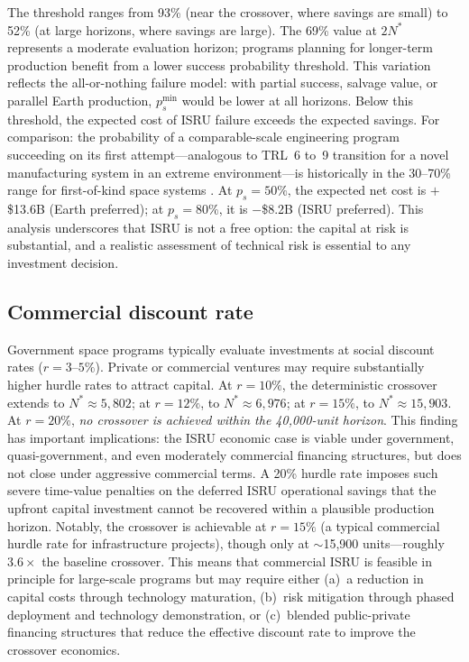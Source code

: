 \documentclass[5p,twocolumn]{elsarticle}
\begin{document}
The threshold ranges from 93\% (near the crossover, where savings are small) to 52\% (at large horizons, where savings are large). The 69\% value at $2N^*$ represents a moderate evaluation horizon; programs planning for longer-term production benefit from a lower success probability threshold. This variation reflects the all-or-nothing failure model: with partial success, salvage value, or parallel Earth production, $p_s^{\min}$ would be lower at all horizons. Below this threshold, the expected cost of ISRU failure exceeds the expected savings. For comparison: the probability of a comparable-scale engineering program succeeding on its first attempt---analogous to TRL~6 to~9 transition for a novel manufacturing system in an extreme environment---is historically in the 30--70\% range for first-of-kind space systems \cite{wertz2011}. At $p_s = 50\%$, the expected net cost is $+$\$13.6B (Earth preferred); at $p_s = 80\%$, it is $-$\$8.2B (ISRU preferred). This analysis underscores that ISRU is not a free option: the capital at risk is substantial, and a realistic assessment of technical risk is essential to any investment decision.

\subsection{Commercial discount rate}
\label{sec:commercial_rate}

Government space programs typically evaluate investments at social discount rates ($r = 3$--$5\%$). Private or commercial ventures may require substantially higher hurdle rates to attract capital. At $r = 10\%$, the deterministic crossover extends to $N^* \approx 5{,}802$; at $r = 12\%$, to $N^* \approx 6{,}976$; at $r = 15\%$, to $N^* \approx 15{,}903$. At $r = 20\%$, \emph{no crossover is achieved within the 40{,}000-unit horizon}. This finding has important implications: the ISRU economic case is viable under government, quasi-government, and even moderately commercial financing structures, but does not close under aggressive commercial terms. A 20\% hurdle rate imposes such severe time-value penalties on the deferred ISRU operational savings that the upfront capital investment cannot be recovered within a plausible production horizon. Notably, the crossover is achievable at $r = 15\%$ (a typical commercial hurdle rate for infrastructure projects), though only at $\sim$15{,}900 units---roughly $3.6\times$ the baseline crossover. This means that commercial ISRU is feasible in principle for large-scale programs but may require either (a)~a reduction in capital costs through technology maturation, (b)~risk mitigation through phased deployment and technology demonstration, or (c)~blended public-private financing structures that reduce the effective discount rate to improve the crossover economics.
\end{document}
